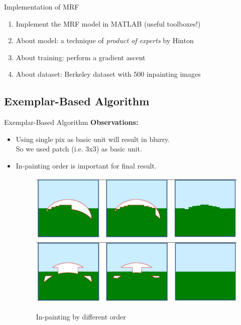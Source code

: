 \documentclass{beamer}
\begin{document}
\begin{frame}{Implementation of MRF}
\begin{enumerate}
\item Implement the MRF model in MATLAB (useful toolboxes!)
\item About model: a technique of \emph{product of experts} by Hinton
\item About training: perform a gradient ascent
\item About dataset: Berkeley dataset with 500 inpainting images
\end{enumerate}
\end{frame}

\subsection{Exemplar-Based Algorithm}
\begin{frame}{Exemplar-Based Algorithm}
	\textbf{Observations:}
	\begin{itemize}
		\item Using single pix as basic unit will result in blurry. \\So we used patch (i.e. 3x3) as basic unit.
		\item In-painting order is important for final result. 
		\begin{figure}
			\centering
			\includegraphics[width=0.8\linewidth]{order1.png}\\
			\includegraphics[width=0.8\linewidth]{order2.png}
			\caption{In-painting by different order}
		\end{figure}
	\end{itemize}
\end{frame}
%
\end{document}
